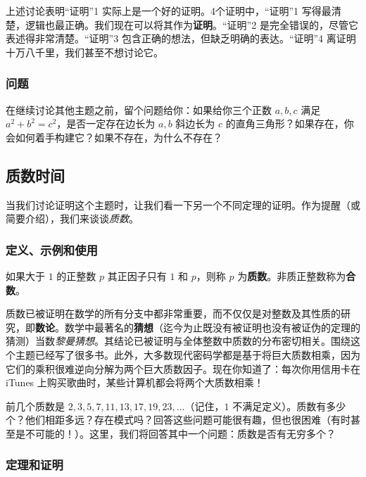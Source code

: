 上述讨论表明“证明”1 实际上是一个好的证明。4个证明中，“证明”1 写得最清楚，逻辑也最正确。我们现在可以将其作为\textbf{证明}。“证明”2 是完全错误的，尽管它表述得非常清楚。“证明”3 包含正确的想法，但缺乏明确的表达。“证明”4 离证明十万八千里，我们甚至不想讨论它。

\subsubsection*{问题}

在继续讨论其他主题之前，留个问题给你：如果给你三个正数 $a,b,c$ 满足 $a^2+b^2=c^2$，是否一定存在边长为 $a,b$ 斜边长为 $c$ 的直角三角形？如果存在，你会如何着手构建它？如果不存在，为什么不存在？

\subsection{质数时间}

当我们讨论证明这个主题时，让我们看一下另一个不同定理的证明。作为提醒（或简要介绍），我们来谈谈\textit{质数}。

\subsubsection*{定义、示例和使用}

\begin{definition}
    如果大于 $1$ 的正整数 $p$ 其正因子只有 $1$ 和 $p$，则称 $p$ 为\textbf{质数}。非质正整数称为\textbf{合数}。
\end{definition}

质数已被证明在数学的所有分支中都非常重要，而不仅仅是对整数及其性质的研究，即\textbf{数论}。数学中最著名的\textbf{猜想}（迄今为止既没有被证明也没有被证伪的定理的猜测）当数\textit{黎曼猜想}。其结论已被证明与全体整数中质数的分布密切相关。围绕这个主题已经写了很多书。此外，大多数现代密码学都是基于将巨大质数相乘，因为它们的乘积很难逆向分解为两个巨大质数因子。现在你知道了：每次你用信用卡在 iTunes 上购买歌曲时，某些计算机都会将两个大质数相乘！

前几个质数是 $2, 3, 5, 7, 11, 13, 17, 19, 23,\dots$（记住，$1$ 不满足定义）。质数有多少个？他们相距多远？存在模式吗？回答这些问题可能很有趣，但也很困难（有时甚至是不可能的！）。这里，我们将回答其中一个问题：质数是否有无穷多个？

\subsubsection*{定理和证明}


